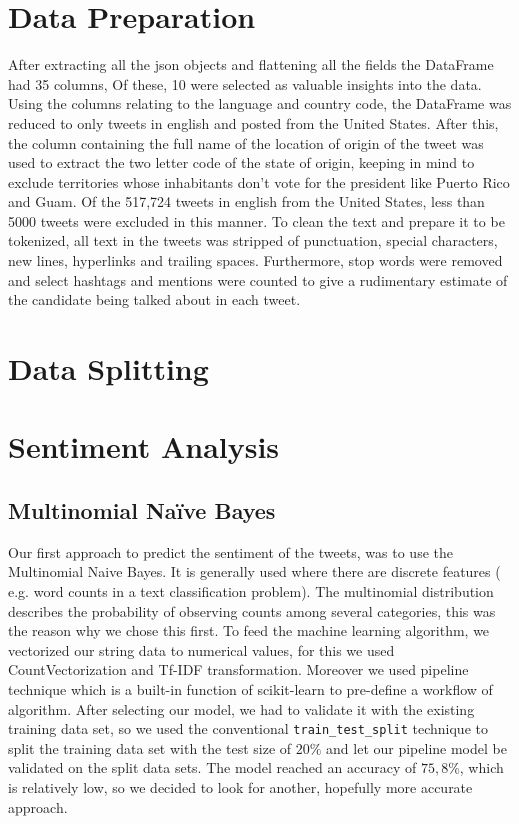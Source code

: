 \documentclass{article}
\begin{document}
  \tableofcontents
  \thispagestyle{empty}
  \pagebreak
  \setcounter{page}{1}
  \setcounter{section}{0}
  \section{Data Preparation}
  After extracting all the json objects and flattening all the fields
  the DataFrame had 35 columns, Of these, 10 were selected as valuable
  insights into the data.\\
  
  Using the columns relating to the language and country code, the
  DataFrame was reduced to only tweets in english and posted from the
  United States. After this, the column containing the full name of
  the location of origin of the tweet was used to extract the two
  letter code of the state of origin, keeping in mind to exclude
  territories whose inhabitants don’t vote for the president like
  Puerto Rico and Guam. Of the 517,724 tweets in english from the
  United States, less than 5000 tweets were excluded in this
  manner. To clean the text and prepare it to be tokenized, all text
  in the tweets was stripped of punctuation, special characters, new
  lines, hyperlinks and trailing spaces. Furthermore, stop words were
  removed and select hashtags and mentions were counted to give a
  rudimentary estimate of the candidate being talked about in each
  tweet.
  
  \section{Data Splitting}
  \section{Sentiment Analysis}
  \subsection{Multinomial Naïve Bayes}
  Our first approach to predict the sentiment of the tweets, was to
  use the Multinomial Naive Bayes. It is generally used where there
  are discrete features ( e.g. word counts in a text classification
  problem). The multinomial distribution describes the probability of
  observing counts among several categories, this was the reason why
  we chose this first. To feed the machine learning algorithm, we
  vectorized our string data to numerical values, for this  we used
  CountVectorization and Tf-IDF transformation. Moreover we used
  pipeline technique which is a built-in function of scikit-learn to
  pre-define a workflow of algorithm. After selecting our model, we
  had to validate it with the existing training data set, so we used
  the conventional \texttt{train\_test\_split} technique to split the
  training data set with the test size of $20\%$ and let our pipeline
  model be validated on the split data sets. The model reached an
  accuracy of $75,8\%$, which is relatively low, so we decided to look
  for another, hopefully more accurate approach. 
  
\end{document}
